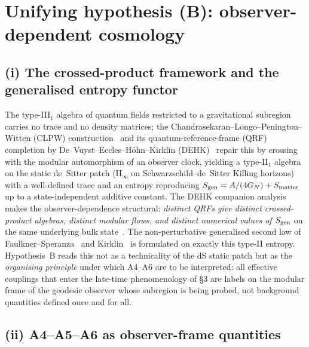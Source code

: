 
\section{Unifying hypothesis (B): observer-dependent cosmology}
\label{sec:B-observer-dependent}

\subsection*{(i) The crossed-product framework and the generalised entropy functor}

The type-III$_1$ algebra of quantum fields restricted to a gravitational
subregion carries no trace and no density matrices; the
Chandrasekaran--Longo--Penington--Witten (CLPW) construction~\cite{CLPW2023}
and its quantum-reference-frame (QRF) completion by De~Vuyst--Eccles--H\"ohn--Kirklin
(DEHK)~\cite{DEHK2025a,DEHK2025b} repair this by crossing with the modular
automorphism of an observer clock, yielding a type-II$_1$ algebra on the static
de~Sitter patch (II$_\infty$ on Schwarzschild--de~Sitter Killing horizons) with a
well-defined trace and an entropy reproducing $S_{\rm gen} = A/(4G_N) + S_{\rm matter}$
up to a state-independent additive constant. The DEHK companion analysis makes
the observer-dependence structural: \emph{distinct QRFs give distinct crossed-product
algebras, distinct modular flows, and distinct numerical values of $S_{\rm gen}$} on the
same underlying bulk state~\cite{DEHK2025a}. The non-perturbative generalised
second law of Faulkner--Speranza~\cite{FaulknerSperanza2024} and
Kirklin~\cite{Kirklin2025} is formulated on exactly this type-II entropy.
Hypothesis~B reads this not as a technicality of the dS static patch but as the
\emph{organising principle} under which A4--A6 are to be interpreted: all
effective couplings that enter the late-time phenomenology of \S3 are labels on
the modular frame of the geodesic observer whose subregion is being probed,
not background quantities defined once and for all.

\subsection*{(ii) A4--A5--A6 as observer-frame quantities}

